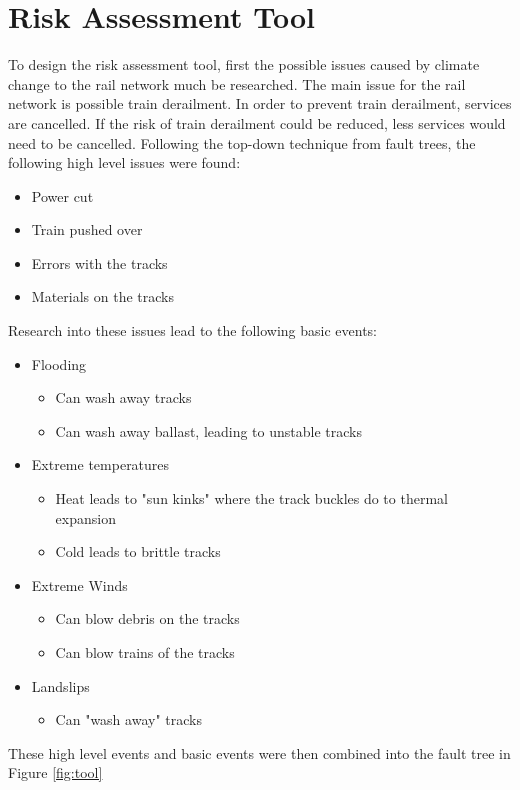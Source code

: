 \documentclass[11pt,a4]{article}
\begin{document}
\section{Risk Assessment Tool}
To design the risk assessment tool, first the possible issues caused by climate change to
the rail network much be researched.
The main issue for the rail network is possible train derailment.
In order to prevent train derailment, services are cancelled.
If the risk of train derailment could be reduced, less services would need to be
cancelled.
Following the top-down technique from fault trees, the following high level issues were 
found:
\begin{itemize}
	\item Power cut
	\item Train pushed over
	\item Errors with the tracks
	\item Materials on the tracks
\end{itemize}
Research into these issues lead to the following basic events:
\begin{itemize}
	\item Flooding
		\begin{itemize}
			\item Can wash away tracks
			\item Can wash away ballast, leading to unstable tracks
		\end{itemize}
	\item Extreme temperatures
		\begin{itemize}
			\item Heat leads to "sun kinks" where the track buckles do to
				thermal expansion
			\item Cold leads to brittle tracks
		\end{itemize}
	\item Extreme Winds
		\begin{itemize}
			\item Can blow debris on the tracks
			\item Can blow trains of the tracks
		\end{itemize}
	\item Landslips
		\begin{itemize}
			\item Can "wash away" tracks
		\end{itemize}
\end{itemize}

These high level events and basic events were then combined into the fault tree in
Figure \ref{fig:tool}
\end{document}
